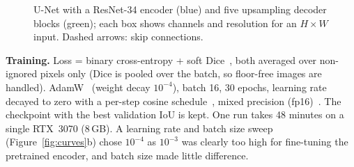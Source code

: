 \documentclass[final]{article}
\begin{document}
\begin{figure}[h]
  \centering
  \caption{U-Net with a ResNet-34 encoder (blue) and five upsampling decoder blocks (green); each box
  shows channels and resolution for an $H{\times}W$ input. Dashed arrows: skip connections.}
  \label{fig:unet}
\end{figure}

\textbf{Training.} Loss = binary cross-entropy + soft Dice~\citep{milletari2016vnet}, both averaged
over non-ignored pixels only (Dice is pooled over the batch, so floor-free images are handled).
AdamW~\citep{loshchilov2019adamw} (weight decay $10^{-4}$), batch 16, 30 epochs, learning rate
decayed to zero with a per-step cosine schedule~\citep{loshchilov2017sgdr}, mixed precision
(fp16)~\citep{micikevicius2018mixed}. The checkpoint with the best validation IoU is kept. One run
takes 48 minutes on a single RTX~3070 (8\,GB). A learning rate and batch size sweep
(Figure~\ref{fig:curves}b) chose $10^{-4}$ as $10^{-3}$ was clearly too high for fine-tuning the
pretrained encoder, and batch size made little difference.
\end{document}
